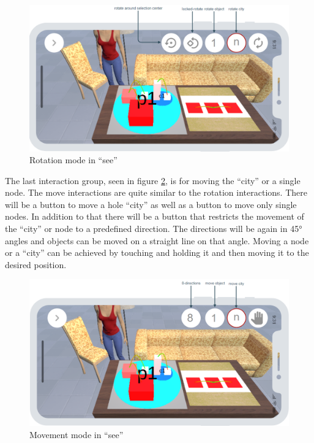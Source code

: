 \begin{figure}[htb]
    \centering
    \includegraphics[width=1\textwidth]{Concept/img/menu4.png}
    \caption{Rotation mode in \enquote{\gls{see}}}\label{fig:rotate}
\end{figure}

The last interaction group, seen in figure \ref{fig:move}, is for moving the \enquote{\gls{city}} or a single node.
The move interactions are quite similar to the rotation interactions.
There will be a button to move a hole \enquote{\gls{city}} as well as a button to move only single nodes.
In addition to that there will be a button that restricts the movement of the \enquote{\gls{city}} or node to a predefined direction.
The directions will be again in 45° angles and objects can be moved on a straight line on that angle.
Moving a node or a \enquote{\gls{city}} can be achieved by touching and holding it and then moving it to the desired position.
\begin{figure}[htb]
    \centering
    \includegraphics[width=1\textwidth]{Concept/img/menu5.png}
    \caption{Movement mode in \enquote{\gls{see}}}\label{fig:move}
\end{figure}

